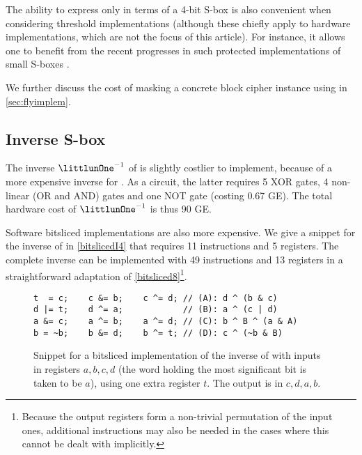 The ability to express \littlunOne only in terms of a 4-bit S-box is also convenient when considering threshold implementations (although these chiefly apply to hardware implementations,
which are not the focus of this article). For instance, it allows one to benefit from the recent progresses in such protected implementations of small S-boxes \cite{ti-4bit}.

We further discuss the cost of masking a concrete block cipher instance using \littlunOne in \autoref{sec:flyimplem}.

\subsection{Inverse S-box}
The inverse $\littlunOne^{-1}$ of \littlunOne is slightly costlier to implement, because of a more expensive inverse for \littlunS. As a circuit, the latter requires 5 XOR gates, 4 non-linear (OR and AND) gates
and one NOT gate (costing 0.67 GE). The total hardware cost of $\littlunOne^{-1}$ is thus 90 GE.

Software bitsliced implementations are also more expensive. We give a snippet for the inverse of \littlunS in
\autoref{bitslicedI4} that requires 11 instructions and 5 registers. The complete inverse can be implemented with 49 instructions and 13 registers in a straightforward adaptation of \autoref{bitsliced8}\footnote{Because
the output registers form a non-trivial permutation of the input ones, additional instructions may also be needed in the cases where this cannot be dealt with implicitly.}.

\begin{figure}[ht]
\begin{verbatim}
t  = c;    c &= b;    c ^= d; // (A): d ^ (b & c)
d |= t;    d ^= a;            // (B): a ^ (c | d) 
a &= c;    a ^= b;    a ^= d; // (C): b ^ B ^ (a & A) 
b = ~b;    b &= d;    b ^= t; // (D): c ^ (~b & B)
\end{verbatim}
\caption[Snippet for a bitsliced \C implementation of the inverse of \littlunS.]{Snippet for a bitsliced \C implementation of the inverse of \littlunS \label{bitslicedI4} with inputs in registers $a,b,c,d$ (the word holding the most significant bit is taken to be $a$), using one extra register $t$.
The output is in $c,d,a,b$.}
\end{figure}
